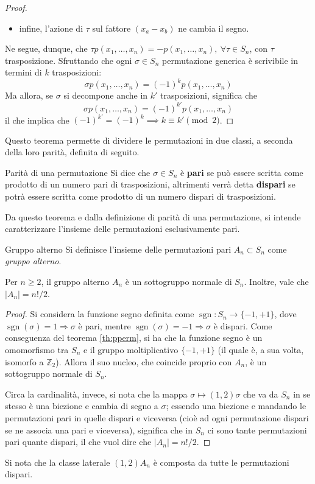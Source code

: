 \documentclass[11pt, a4paper]{scrartcl}
\theoremstyle{definition}
\numberwithin{esempio}{section}
\theoremstyle{definition}
\numberwithin{obs}{section}
\numberwithin{nota}{section}
\numberwithin{equation}{subsection}
\begin{document}
\begin{teorema}
\begin{proof}
\begin{itemize}
			\item infine, l'azione di $\tau $ sul fattore $(x_a-x_b)$ ne cambia il segno.
		\end{itemize}
		Ne segue, dunque, che $\tau p(x_1,\ldots,x_n) = - p(x_1,\ldots,x_n), \ \forall \tau  \in S_n$, con $\tau $ trasposizione.
		Sfruttando che ogni $\sigma \in S_n$ permutazione generica \`e scrivibile in termini di $k$ trasposizioni:
		\[
		\sigma p(x_1,\ldots,x_n) = (-1)^k p(x_1,\ldots,x_n)
		\] 
		Ma allora, se $\sigma $ si decompone anche in $k'$ trasposizioni, significa che 
		\[
		\sigma p(x_1,\ldots,x_n) = (-1)^{k'} p(x_1,\ldots,x_n)
		\] 
		il che implica che $(-1)^{k'} = (-1)^k \implies k\equiv k'\pmod{2} $.
	\end{proof}
\end{teorema}
\noindent Questo teorema permette di dividere le permutazioni in due classi, a seconda della loro parit\`a, definita di seguito.
\begin{definizione}
	{Parit\`a di una permutazione}{}
	Si dice che $\sigma \in S_n$ \`e \textbf{pari} se pu\`o essere scritta come prodotto di un numero pari di trasposizioni, altrimenti verr\`a detta \textbf{dispari} se potr\`a essere scritta come prodotto di un numero dispari di trasposizioni.
\end{definizione}
\noindent Da questo teorema e dalla definizione di parit\`a di una permutazione, si intende caratterizzare l'insieme delle permutazioni esclusivamente pari.
\begin{definizione}
	{Gruppo alterno}{}
	Si definisce l'insieme delle permutazioni pari $A_n \subset S_n$ come \textit{gruppo alterno}.
\end{definizione}
\begin{corollario}
	{}{}
	Per $n\ge 2$, il gruppo alterno $A_n$ \`e un sottogruppo normale di $S_n$.
	Inoltre, vale che $|A_n| = n! / 2$.
	\begin{proof}
		Si considera la funzione segno definita come $\operatorname{sgn} :S_n \to \{-1,+1\}$, dove $\operatorname{sgn} (\sigma ) = 1 \Rightarrow \sigma $ \`e pari, mentre $\operatorname{sgn} (\sigma )= -1\Rightarrow \sigma $ \`e dispari.
		Come conseguenza del teorema \ref{th:pperm}, si ha che la funzione segno \`e un omomorfismo tra $S_n$ e il gruppo moltiplicativo $\{-1,+1\}$ (il quale \`e, a sua volta, isomorfo a $\mathbb{Z}_2$).
		Allora il suo nucleo, che coincide proprio con $A_n$, \`e un sottogruppo normale di $S_n$.

		Circa la cardinalit\`a, invece, si nota che la mappa $\sigma \mapsto (1,2)\sigma $ che va da $S_n$ in se stesso \`e una biezione e cambia di segno a $\sigma $; essendo una biezione e mandando le permutazioni pari in quelle dispari e viceversa (cio\`e ad ogni permutazione dispari se ne associa una pari e viceversa), significa che in $S_n$ ci sono tante permutazioni pari quante dispari, il che vuol dire che $|A_n| = n! / 2$.
	\end{proof}
\end{corollario}
\noindent Si nota che la classe laterale $(1,2)A_n$ \`e composta da tutte le permutazioni dispari.
\end{document}
